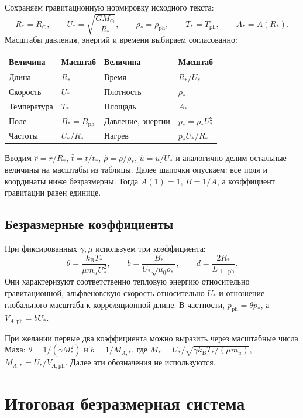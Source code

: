 \documentclass[11pt,a4paper]{article}
\newcommand{\ph}{\mathrm{ph}}
\begin{document}
Сохраняем гравитационную нормировку исходного текста:
\[
 R_*=R_\odot,\qquad
 U_*=\sqrt{\frac{GM_\odot}{R_*}},\qquad
 \rho_*=\rho_\ph,\qquad T_*=T_\ph,\qquad A_*=A(R_*).
\]
Масштабы давления, энергий и времени выбираем согласованно:
\begin{center}
\small
\setlength{\tabcolsep}{8pt}
\begin{tabular}{@{}ll@{\qquad}ll@{}}
\toprule
Величина & Масштаб & Величина & Масштаб\\
\midrule
Длина & $R_*$ & Время & $R_*/U_*$\\
Скорость & $U_*$ & Плотность & $\rho_*$\\
Температура & $T_*$ & Площадь & $A_*$\\
Поле & $B_*=B_\ph$ & Давление, энергии & $p_*=\rho_*U_*^2$\\
Частоты & $U_*/R_*$ & Нагрев & $p_*U_*/R_*$\\
\bottomrule
\end{tabular}
\end{center}

Вводим $\hat r=r/R_*$, $\hat t=t/t_*$,
$\hat\rho=\rho/\rho_*$, $\hat u=u/U_*$ и аналогично делим
остальные величины на масштабы из таблицы.
Далее шапочки опускаем: все поля и координаты ниже безразмерны.
Тогда $A(1)=1$, $B=1/A$, а коэффициент гравитации равен единице.

\subsection*{Безразмерные коэффициенты}

При фиксированных $\gamma,\mu$ используем три коэффициента:
\begin{equation}
 \theta=\frac{k_{\mathrm B}T_*}{\mu m_uU_*^2},\qquad
 b=\frac{B_*}{U_*\sqrt{\mu_0\rho_*}},\qquad
 d=\frac{2R_*}{L_{\perp,\ph}}.
 \label{eq:parameters}
\end{equation}
Они характеризуют соответственно тепловую энергию относительно
гравитационной, альфвеновскую скорость относительно $U_*$
и отношение глобального масштаба к корреляционной длине.
В частности, $p_\ph=\theta p_*$, а $V_{A,\ph}=bU_*$.

При желании первые два коэффициента можно выразить через
масштабные числа Маха: $\theta=1/(\gamma M_*^2)$ и $b=1/M_{A,*}$,
где $M_*=U_*/\sqrt{\gamma k_{\mathrm B}T_*/(\mu m_u)}$,
$M_{A,*}=U_*/V_{A,\ph}$. Далее эти обозначения не используются.

\section{Итоговая безразмерная система}
\end{document}

